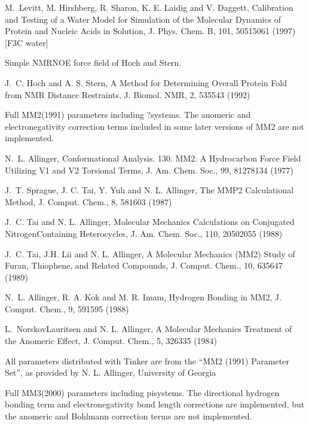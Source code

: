 \documentclass[letterpaper,11pt,english]{sphinxmanual}
\begin{document}
M. Levitt, M. Hirshberg, R. Sharon, K. E. Laidig and V. Daggett, Calibration and Testing of a Water Model for Simulation of the Molecular Dynamics of Protein and Nucleic Acids in Solution, J. Phys. Chem. B, 101, 5051\sphinxhyphen{}5061 (1997)  {[}F3C water{]}


Simple NMR\sphinxhyphen{}NOE force field of Hoch and Stern.

J. C. Hoch and A. S. Stern, A Method for Determining Overall Protein Fold from NMR Distance Restraints, J. Biomol. NMR, 2, 535\sphinxhyphen{}543 (1992)


Full MM2(1991) parameters including ?\sphinxhyphen{}systems. The anomeric and electronegativity correction terms included in some later versions of MM2 are not implemented.

N. L. Allinger, Conformational Analysis. 130. MM2. A Hydrocarbon Force Field Utilizing V1 and V2 Torsional Terms, J. Am. Chem. Soc., 99, 8127\sphinxhyphen{}8134 (1977)

J. T. Sprague, J. C. Tai, Y. Yuh and N. L. Allinger, The MMP2 Calculational Method, J. Comput. Chem., 8, 581\sphinxhyphen{}603 (1987)

J. C. Tai and N. L. Allinger, Molecular Mechanics Calculations on Conjugated Nitrogen\sphinxhyphen{}Containing Heterocycles, J. Am. Chem. Soc., 110, 2050\sphinxhyphen{}2055 (1988)

J. C. Tai, J.\sphinxhyphen{}H. Lii and N. L. Allinger, A Molecular Mechanics (MM2) Study of Furan, Thiophene, and Related Compounds, J. Comput. Chem., 10, 635\sphinxhyphen{}647 (1989)

N. L. Allinger, R. A. Kok and M. R. Imam, Hydrogen Bonding in MM2, J. Comput. Chem., 9, 591\sphinxhyphen{}595 (1988)

L. Norskov\sphinxhyphen{}Lauritsen and N. L. Allinger, A Molecular Mechanics Treatment of the Anomeric Effect, J. Comput. Chem., 5, 326\sphinxhyphen{}335 (1984)

All parameters distributed with Tinker are from the “MM2 (1991) Parameter Set”, as provided by N. L. Allinger, University of Georgia


Full MM3(2000) parameters including pi\sphinxhyphen{}systems. The directional hydrogen bonding term and electronegativity bond length corrections are implemented, but the anomeric and Bohlmann correction terms are not implemented.
\end{document}
